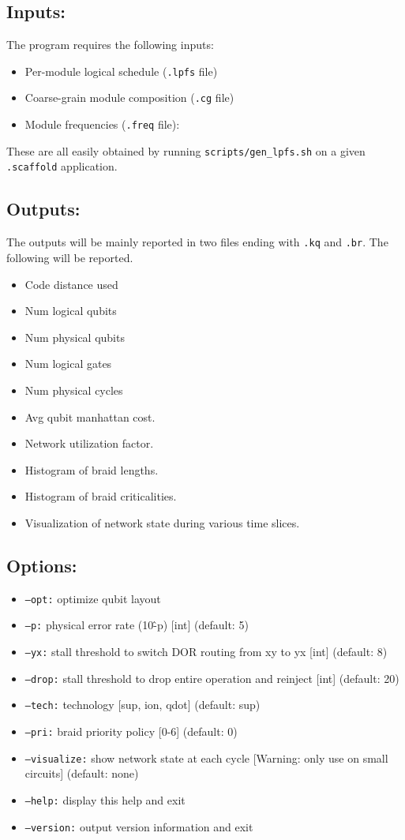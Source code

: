 \documentclass{article}
\begin{document}
\subsection{Inputs:} 
The program requires the following inputs:
\begin{itemize}
\item Per-module logical schedule ({\tt.lpfs} file)
\item Coarse-grain module composition ({\tt.cg} file)
\item Module frequencies ({\tt.freq} file):
\end{itemize}
These are all easily obtained by running {\tt scripts/gen\_lpfs.sh} on a given {\tt .scaffold} application.


\subsection{Outputs:}
The outputs will be mainly reported in two files ending with {\tt .kq} and {\tt .br}. The following will be reported.
\begin{itemize}
\item Code distance used
\item Num logical qubits
\item Num physical qubits
\item Num logical gates
\item Num physical cycles
\item Avg qubit manhattan cost.
\item Network utilization factor. 
\item Histogram of braid lengths. 
\item Histogram of braid criticalities. 
\item Visualization of network state during various time slices.
\end{itemize}

\subsection{Options:}
\begin{itemize}
\item  {\tt--opt:}      	optimize qubit layout
\item  {\tt--p:}         	physical error rate (10\^-p) [int] (default: 5)
\item  {\tt--yx:}       	stall threshold to switch DOR routing from xy to yx [int] (default: 8)
\item  {\tt--drop:}    	stall threshold to drop entire operation and reinject [int] (default: 20)
\item  {\tt--tech:}    	technology [sup, ion, qdot] (default: sup)
\item  {\tt--pri:}       	braid priority policy [0-6] (default: 0)
\item  {\tt--visualize:} show network state at each cycle [Warning: only use on small circuits] (default: none)
\item  {\tt--help:}    	display this help and exit
\item  {\tt--version:} output version information and exit
\end{itemize}
\end{document}
